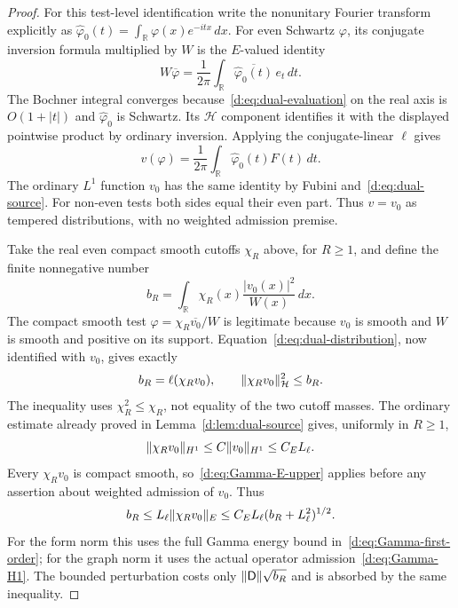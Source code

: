 \documentclass[11pt,a4paper]{article}
\numberwithin{equation}{section}
\theoremstyle{definition}\newtheorem{definition}[theorem]{Definition}
\theoremstyle{remark}\newtheorem{remark}[theorem]{Remark}
\newcommand{\R}{\mathbb R}\newcommand{\C}{\mathbb C}\newcommand{\N}{\mathbb N}
\newcommand{\Hh}{\mathcal H}\newcommand{\Hw}{\mathcal H}
\begin{document}
\begin{proof}
For this test-level identification write the nonunitary Fourier transform explicitly as
$\widehat\varphi_0(t)=\int_\R\varphi(x)e^{-itx}\,dx$.
For even Schwartz $\varphi$, its conjugate inversion formula multiplied by $W$ is the $E$-valued identity
\[
 W\overline\varphi
 =\frac1{2\pi}\int_\R\overline{\widehat\varphi_0(t)}\,e_t\,dt.
\]
The Bochner integral converges because~\eqref{d:eq:dual-evaluation} on the real axis is $O(1+|t|)$ and $\widehat\varphi_0$ is Schwartz. Its $\Hh$ component identifies it with the displayed pointwise product by ordinary inversion. Applying the conjugate-linear $\ell$ gives
\begin{equation}\label{d:eq:dual-test-Fourier}
 v(\varphi)=\frac1{2\pi}\int_\R\widehat\varphi_0(t)F(t)\,dt.
\end{equation}
The ordinary $L^1$ function $v_0$ has the same identity by Fubini and~\eqref{d:eq:dual-source}. For non-even tests both sides equal their even part. Thus $v=v_0$ as tempered distributions, with no weighted admission premise.

Take the real even compact smooth cutoffs $\chi_R$ above, for $R\ge1$, and define the finite nonnegative number
\[
 b_R=\int_\R\chi_R(x)\frac{|v_0(x)|^2}{W(x)}\,dx.
\]
The compact smooth test $\varphi=\chi_R\overline{v_0}/W$ is legitimate because $v_0$ is smooth and $W$ is smooth and positive on its support. Equation~\eqref{d:eq:dual-distribution}, now identified with $v_0$, gives exactly
\begin{equation}\label{d:eq:dual-cutoff-test}
 b_R=\ell(\chi_Rv_0),\qquad
 \norm{\chi_Rv_0}_{\Hh}^2\le b_R.
\end{equation}
The inequality uses $\chi_R^2\le\chi_R$, not equality of the two cutoff masses. The ordinary estimate already proved in Lemma~\ref{d:lem:dual-source} gives, uniformly in $R\ge1$,
\[
 \lVert\chi_Rv_0\rVert_{H^1}\le C\lVert v_0\rVert_{H^1}\le C_E L_\ell.
\]
Every $\chi_Rv_0$ is compact smooth, so~\eqref{d:eq:Gamma-E-upper} applies before any assertion about weighted admission of $v_0$. Thus
\begin{equation}\label{d:eq:dual-quadratic}
 b_R\le L_\ell\lVert\chi_Rv_0\rVert_E
 \le C_E L_\ell(b_R+L_\ell^2)^{1/2}.
\end{equation}
For the form norm this uses the full Gamma energy bound in~\eqref{d:eq:Gamma-first-order}; for the graph norm it uses the actual operator admission~\eqref{d:eq:Gamma-H1}. The bounded perturbation costs only $\lVert\mathsf D\rVert\sqrt{b_R}$ and is absorbed by the same inequality.


\end{proof}
\end{document}
